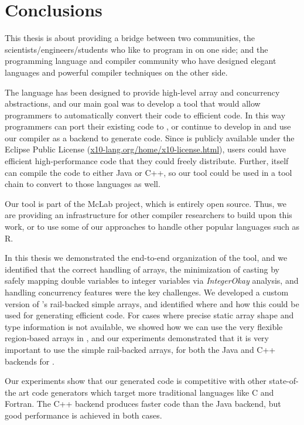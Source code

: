 \section{Conclusions}
This thesis is about providing a bridge between two communities,  the
scientists/engineers/students who like to program in \matlab on one
side;  and the programming language and compiler community who have
designed elegant languages and powerful compiler techniques on the other
side.   

The \xten language has been designed to provide high-level  array and
concurrency abstractions,  and  our main goal was to develop a tool that
would allow programmers to automatically convert their \matlab code to
efficient \xten code.    In this way programmers can port their existing
\matlab code to \xten,  or continue to develop in \matlab and use our
\mixten compiler as a backend to generate \xten code.    Since \xten is
publicly available under the Eclipse Public License
(\url{x10-lang.org/home/x10-license.html}),  users could have efficient
high-performance code that they could freely distribute.    Further,
\xten itself can compile the code to either Java or C++,  so our tool
could be used in a tool chain to convert \matlab to those languages as
well.

Our tool is part of the McLab project, which is entirely open
source.   Thus, we are providing  an infrastructure for other compiler
researchers to build upon this work,  or to use some of our approaches
to handle other popular languages such as R.

In this thesis we demonstrated the end-to-end organization of the \mixten
tool, and we identified that the correct handling of arrays, the
minimization of casting by safely mapping \matlab double variables to
\xten integer variables via \emph{IntegerOkay} analysis,  and handling concurrency
features were the key challenges.   We developed a custom version of \xten's
rail-backed simple arrays,  and identified where and how this
could be used for generating efficient \xten code.  For cases where
precise static array shape and type information is not available, we
showed how we can use the very flexible region-based arrays in \xten,
and our experiments demonstrated that it is very important to use the
simple rail-backed arrays, for both the Java and C++ backends for \xten.

Our experiments show that our generated \xten code is competitive with
other state-of-the art code generators which target more traditional
languages like C and Fortran.   The C++ \xten backend produces faster
code than the Java backend,  but good performance is achieved in both
cases.  

